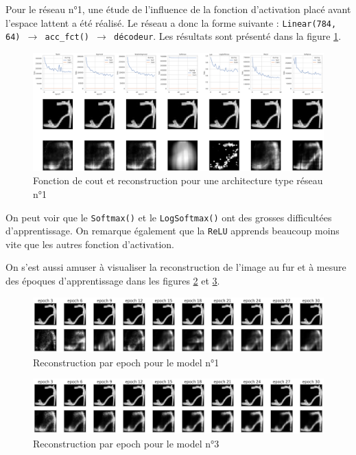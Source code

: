 \documentclass{article}
\begin{document}
Pour le réseau n°1, une étude de l'influence de la fonction d'activation placé avant l'espace lattent a été réalisé. Le réseau a donc la forme suivante : \texttt{Linear(784, 64) $\rightarrow$ acc\_fct() $\rightarrow$ décodeur}. Les résultats sont présenté dans la figure \ref*{fig:accfct}. 

\begin{figure}[htbp]
    \centering
    \includegraphics*[width=\textwidth]{encoder_decoder_middle_func_simple_net.pdf}
    \caption{Fonction de cout et reconstruction pour une architecture type réseau n°1}
    \label{fig:accfct}
\end{figure}

On peut voir que le \texttt{Softmax()} et le \texttt{LogSoftmax()} ont des grosses difficultées d'apprentissage. On remarque également que la \texttt{ReLU} apprends beaucoup moins vite que les autres fonction d'activation. 

On s'est aussi amuser à visualiser la reconstruction de l'image au fur et à mesure des époques d'apprentissage dans les figures \ref*{fig:perepochsimple} et \ref*{fig:perepochbig}.

\begin{figure}[htbp]
    \centering
    \includegraphics*[width=\textwidth]{reconstruction_per_epoch_simple_model.pdf}
    \caption{Reconstruction par epoch pour le model n°1}
    \label{fig:perepochsimple}
\end{figure}

\begin{figure}[htbp]
    \centering
    \includegraphics*[width=\textwidth]{reconstruction_per_epoch_big_model.pdf}
    \caption{Reconstruction par epoch pour le model n°3}
    \label{fig:perepochbig}
\end{figure}
\end{document}
